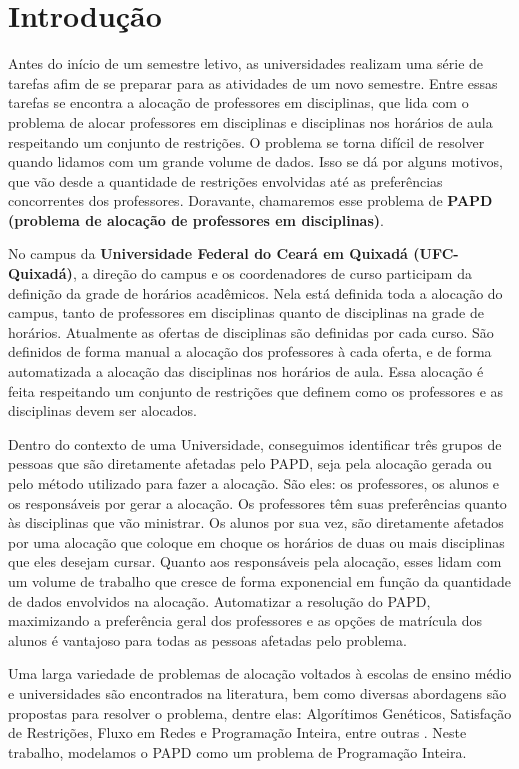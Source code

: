 \chapter{Introdução}
\label{introducao}

Antes do início de um semestre letivo, as universidades realizam uma série de tarefas afim de se preparar para as atividades de um novo semestre. Entre essas tarefas se encontra a alocação de professores em disciplinas, que lida com o problema de alocar professores em disciplinas e disciplinas nos horários de aula respeitando um conjunto de restrições. O problema se torna difícil de resolver quando lidamos com um grande volume de dados. Isso se dá por alguns motivos, que vão desde a quantidade de restrições envolvidas até as preferências concorrentes dos professores. Doravante, chamaremos esse problema de \textbf{PAPD (problema de alocação de professores em disciplinas)}.

No campus da \textbf{Universidade Federal do Ceará em Quixadá (UFC-Quixadá)}, a direção do campus e os coordenadores de curso participam da definição da grade de horários acadêmicos. Nela está definida toda a alocação do campus, tanto de professores em disciplinas quanto de disciplinas na grade de horários. Atualmente as ofertas de disciplinas são definidas por cada curso. São definidos de forma manual a alocação dos professores à cada oferta, e de forma automatizada a alocação das disciplinas nos horários de aula. Essa alocação é feita respeitando um conjunto de restrições que definem como os professores e as disciplinas devem ser alocados.

Dentro do contexto de uma Universidade, conseguimos identificar três grupos de pessoas que são diretamente afetadas pelo PAPD, seja pela alocação gerada ou pelo método utilizado para fazer a alocação. São eles: os professores, os alunos e os responsáveis por gerar a alocação. Os professores têm suas preferências quanto às disciplinas que vão ministrar. Os alunos por sua vez, são diretamente afetados por uma alocação que coloque em choque os horários de duas ou mais disciplinas que eles desejam cursar. Quanto aos responsáveis pela alocação, esses lidam com um volume de trabalho que cresce de forma exponencial em função da quantidade de dados envolvidos na alocação. Automatizar a resolução do PAPD, maximizando a preferência geral dos professores e as opções de matrícula dos alunos é vantajoso para todas as pessoas afetadas pelo problema.

Uma larga variedade de problemas de alocação voltados à escolas de ensino médio e universidades são encontrados na literatura, bem como diversas abordagens são propostas para resolver o problema, dentre elas: Algorítimos Genéticos, Satisfação de Restrições, Fluxo em Redes e Programação Inteira, entre outras \cite{schaerf1999survey}. Neste trabalho, modelamos o PAPD como um problema de Programação Inteira. 

